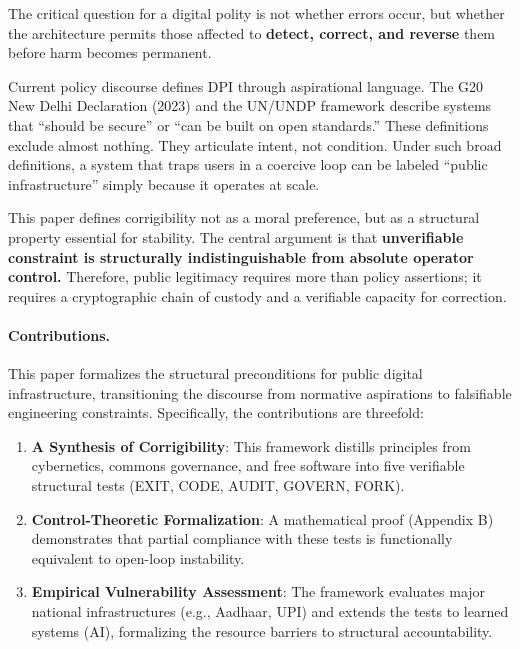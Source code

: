 \documentclass{article}
\begin{document}
The critical question for a digital polity is not whether errors occur, but whether the architecture permits those affected to \textbf{detect, correct, and reverse} them before harm becomes permanent.

Current policy discourse defines DPI through aspirational language. The G20 New Delhi Declaration (2023) and the UN/UNDP framework \citep{undp} describe systems that ``should be secure'' or ``can be built on open standards.'' These definitions exclude almost nothing. They articulate intent, not condition. Under such broad definitions, a system that traps users in a coercive loop can be labeled ``public infrastructure'' simply because it operates at scale.

This paper defines corrigibility not as a moral preference, but as a structural property essential for stability. The central argument is that \textbf{unverifiable constraint is structurally indistinguishable from absolute operator control.} Therefore, public legitimacy requires more than policy assertions; it requires a cryptographic chain of custody and a verifiable capacity for correction.

\paragraph{Contributions.} This paper formalizes the structural preconditions for public digital infrastructure, transitioning the discourse from normative aspirations to falsifiable engineering constraints. Specifically, the contributions are threefold:
\begin{enumerate}[noitemsep]
    \item \textbf{A Synthesis of Corrigibility}: This framework distills principles from cybernetics, commons governance, and free software into five verifiable structural tests (EXIT, CODE, AUDIT, GOVERN, FORK).
    \item \textbf{Control-Theoretic Formalization}: A mathematical proof (Appendix B) demonstrates that partial compliance with these tests is functionally equivalent to open-loop instability.
    \item \textbf{Empirical Vulnerability Assessment}: The framework evaluates major national infrastructures (e.g., Aadhaar, UPI) and extends the tests to learned systems (AI), formalizing the resource barriers to structural accountability.
\end{enumerate}
\end{document}
